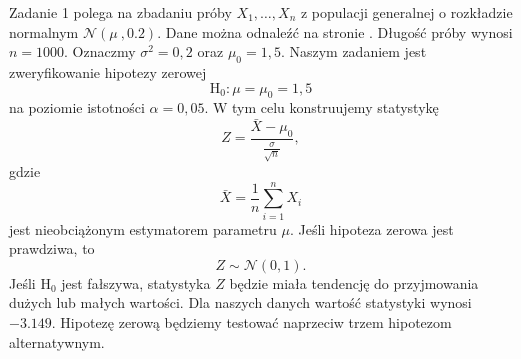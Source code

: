 \documentclass[12pt]{mwart}
\begin{document}
	\noindent Zadanie 1 polega na zbadaniu próby $X_1, \dots, X_n$ z populacji generalnej o rozkładzie normalnym $\mathcal{N}(\mu\ , 0.2)$. Dane można odnaleźć na stronie \cite{dane1}. Długość próby wynosi $n = 1000$. Oznaczmy $\sigma^2 = 0,2$ oraz $\mu_0 = 1,5$. Naszym zadaniem jest zweryfikowanie hipotezy zerowej
	$$ \mathrm{H_0}: \mu = \mu_0 = 1,5 $$
	na poziomie istotności $\alpha = 0,05$. W tym celu konstruujemy statystykę
	$$ Z = \frac{\bar{X}-\mu_0}{\frac{\sigma}{\sqrt{n}}}, $$
	gdzie
	$$ \bar{X} = \frac{1}{n} \sum_{i=1}^n X_i $$
	jest nieobciążonym estymatorem parametru $\mu$. Jeśli hipoteza zerowa jest prawdziwa, to
	$$ Z \sim \mathcal{N}(0,1). $$
	Jeśli $\mathrm{H_0}$ jest fałszywa, statystyka $Z$ będzie miała tendencję do przyjmowania dużych lub małych wartości. Dla naszych danych wartość statystyki wynosi {\boldmath$-3.149$}. Hipotezę zerową będziemy testować naprzeciw trzem hipotezom alternatywnym.
\end{document}
